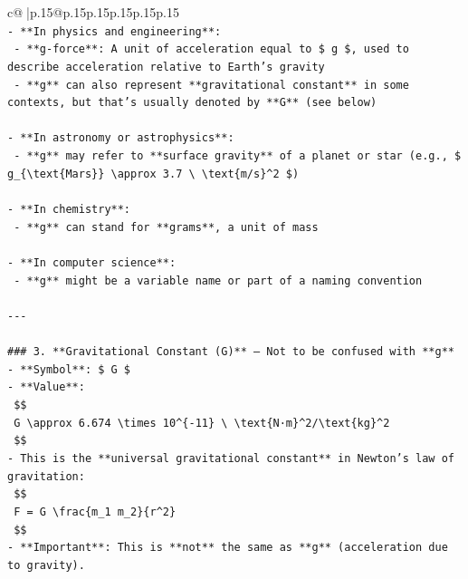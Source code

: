 \documentclass{article}
\begin{document}
{\begin{supertabular}{c@{$\;$}|p{.15\linewidth}@{}p{.15\linewidth}p{.15\linewidth}p{.15\linewidth}p{.15\linewidth}p{.15\linewidth}}
{{{\\ 
\texttt{{-} **In physics and engineering**:} \\
\texttt{  {-} **g{-}force**: A unit of acceleration equal to \$ g \$, used to describe acceleration relative to Earth's gravity} \\
\texttt{  {-} **g** can also represent **gravitational constant** in some contexts, but that's usually denoted by **G** (see below)} \\
\\ 
\texttt{{-} **In astronomy or astrophysics**:} \\
\texttt{  {-} **g** may refer to **surface gravity** of a planet or star (e.g., \$ g\_\{\textbackslash{}text\{Mars\}\} \textbackslash{}approx 3.7 \textbackslash{} \textbackslash{}text\{m/s\}\^{}2 \$)} \\
\\ 
\texttt{{-} **In chemistry**:} \\
\texttt{  {-} **g** can stand for **grams**, a unit of mass} \\
\\ 
\texttt{{-} **In computer science**:} \\
\texttt{  {-} **g** might be a variable name or part of a naming convention} \\
\\ 
\texttt{{-}{-}{-}} \\
\\ 
\texttt{\#\#\# 3. **Gravitational Constant (G)** — Not to be confused with **g**} \\
\texttt{{-} **Symbol**: \$ G \$} \\
\texttt{{-} **Value**:  } \\
\texttt{  \$\$} \\
\texttt{  G \textbackslash{}approx 6.674 \textbackslash{}times 10\^{}\{{-}11\} \textbackslash{} \textbackslash{}text\{N·m\}\^{}2/\textbackslash{}text\{kg\}\^{}2} \\
\texttt{  \$\$} \\
\texttt{{-} This is the **universal gravitational constant** in Newton's law of gravitation:} \\
\texttt{  \$\$} \\
\texttt{  F = G \textbackslash{}frac\{m\_1 m\_2\}\{r\^{}2\}} \\
\texttt{  \$\$} \\
\texttt{{-} **Important**: This is **not** the same as **g** (acceleration due to gravity).} \\
\\ 
}}}
\end{supertabular}}
\end{document}
